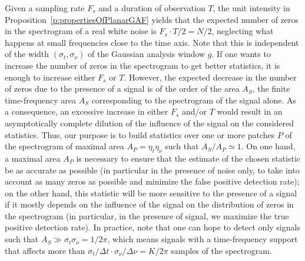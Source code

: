 Given a sampling rate $F_s$ and a duration of observation $T$, the unit
intensity in Proposition~\ref{p:propertiesOfPlanarGAF} yields that the expected
number of zeros in the spectrogram of a real white noise is $F_s\cdot T/2 = N/2$, neglecting what happens at small frequencies close to the time axis. Note that this is independent of the width $(\sigma_t,\sigma_\nu)$ of the Gaussian
analysis window $g$. %
If one wants to increase the number of zeros in the spectrogram to get
better statistics, it is enough to increase either $F_s$ or $T$. However, the
expected decrease in the number of zeros due to the presence of a signal is of
the order of the area $A_S$, the finite time-frequency area $A_S$ corresponding
to the spectrogram of the signal alone. As a consequence, an excessive increase
in either $F_s$ and/or $T$ would result in an asymptotically complete dilution
of the influence of the signal on the considered statistics. Thus, our purpose
is to build statistics over one or more patches $P$ of the spectrogram of maximal area
$A_P=\eta_t\eta_\nu$ such that $A_S/A_P\simeq 1$. On one hand, a maximal area
$A_P$ is necessary to ensure that the estimate of the chosen statistic be as
accurate as possible (in particular in the presence of noise only, to take into
account as many zeros as possible and minimize the false positive detection
rate); on the other hand, this statistic will be more sensitive to the presence
of a signal if it mostly depends on the influence of the signal on the
distribution of zeros in the spectrogram (in particular, in the presence of signal, we maximize
the true positive detection rate). In practice, note that one can hope to detect only signals
such that $A_S\gg \sigma_t\sigma_\nu=1/2\pi$, which means signals with a
time-frequency support that affects more than $\sigma_t/\Delta t\cdot \sigma_\nu/\Delta \nu = K/2\pi$ samples of the spectrogram.



%



